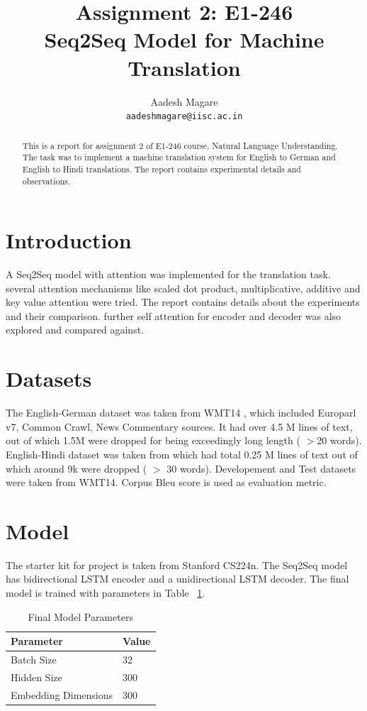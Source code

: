 \documentclass[11pt,a4paper]{article}
\title{Assignment 2: E1-246 \\
Seq2Seq Model for Machine Translation}
\author{Aadesh Magare \\
  \texttt{aadeshmagare@iisc.ac.in} \\}
\date{}
\begin{document}
\maketitle
\begin{abstract}
  This is a report for assignment 2 of E1-246 course, Natural Language Understanding. The task was to implement a machine translation system for English to German and English to Hindi translations. The report contains experimental details and observations.
\end{abstract}

\section{Introduction}

A Seq2Seq model with attention was implemented for the translation task.
several attention mechanisms like scaled dot product, multiplicative, additive and key value attention were tried. The report contains details about the experiments and their comparison. further self attention for encoder and decoder was also explored and compared against.

\section{Datasets}
The English-German dataset was taken from WMT14 \cite{WMT}, which included Europarl v7, Common Crawl, News Commentary sources. It had over 4.5 M lines of text, out of which 1.5M were dropped for being exceedingly long length ( $>$20 words).
English-Hindi dataset was taken from \cite{ufal} which had total 0.25 M lines of text out of which around 9k were dropped ( $>$ 30 words). 
Developement and Test datasets were taken from WMT14. Corpus Bleu score is used as evaluation metric.

\section{Model}
The starter kit for project is taken from Stanford CS224n. \cite{cs224n} The Seq2Seq model has bidirectional LSTM encoder and a unidirectional LSTM decoder. The final model is trained with parameters in Table ~\ref{table1}.

\begin{table}[h]
\centering
\begin{tabular}{|l|l|}
\hline
\textbf{Parameter} & \textbf{Value} \\ \hline
Batch Size  & 32                          \\ \hline
Hidden Size  & 300                         \\ \hline
Embedding Dimensions & 300                         \\ \hline
\end{tabular}
\caption{Final Model Parameters}
\label{table1}
\end{table}
\end{document}
